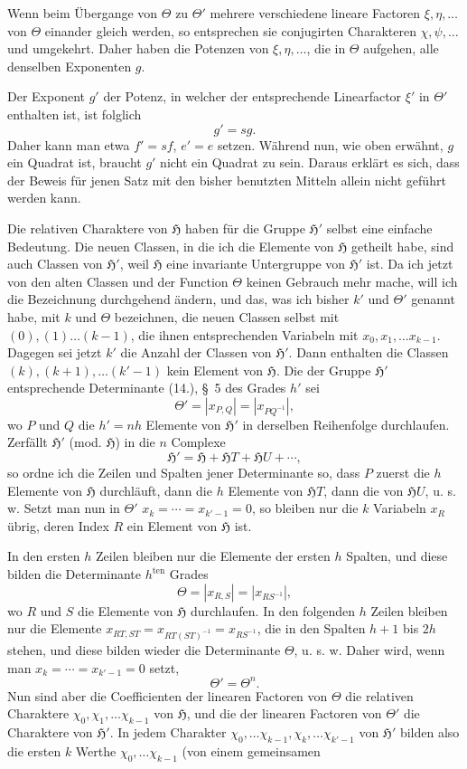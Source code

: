 \documentclass[11pt]{article}
\newcommand{\grp}{\mathfrak{H}}
\begin{document}
Wenn beim Übergange von $\Theta$ zu $\Theta'$ mehrere verschiedene lineare Factoren $\xi,\eta,\ldots$ von $\Theta$ einander gleich werden, so entsprechen sie conjugirten Charakteren $\chi,\psi,\ldots$ und umgekehrt. Daher haben die Potenzen von $\xi,\eta,\ldots$, die in $\Theta$ aufgehen, alle denselben Exponenten $g$.

Der Exponent $g'$ der Potenz, in welcher der entsprechende Linearfactor $\xi'$ in $\Theta'$ enthalten ist, ist folglich
\begin{equation*}\tag{9.}
g'=sg.
\end{equation*}
Daher kann man etwa $f'=sf$, $e'=e$ setzen. Während nun, wie oben erwähnt, $g$ ein Quadrat ist, braucht $g'$ nicht ein Quadrat zu sein. Daraus erklärt es sich, dass der Beweis für jenen Satz mit den bisher benutzten Mitteln allein nicht geführt werden kann.

Die relativen Charaktere von $\grp$ haben für die Gruppe $\grp'$ selbst eine einfache Bedeutung. Die neuen Classen, in die ich die Elemente von $\grp$ getheilt habe, sind auch Classen von $\grp'$, weil $\grp$ eine invariante Untergruppe von $\grp'$ ist. Da ich jetzt von den alten Classen und der Function $\Theta$ keinen Gebrauch mehr mache, will ich die Bezeichnung durchgehend ändern, und das, was ich bisher $k'$ und $\Theta'$ genannt habe, mit $k$ und $\Theta$ bezeichnen, die neuen Classen selbst mit $(0),(1)\ldots(k-1)$, die ihnen entsprechenden Variabeln mit $x_0,x_1,\ldots x_{k-1}$. Dagegen sei jetzt $k'$ die Anzahl der Classen von $\grp'$. Dann enthalten die Classen $(k),(k+1),\ldots(k'-1)$ kein Element von $\grp$. Die der Gruppe $\grp'$ entsprechende Determinante (14.), \S~5 des Grades $h'$ sei
\[
\Theta'=\left|x_{P,Q}\right|=\left|x_{PQ^{-1}}\right|,
\]
wo $P$ und $Q$ die $h'=nh$ Elemente von $\grp'$ in derselben Reihenfolge durchlaufen. Zerfällt $\grp'$ (mod. $\grp$) in die $n$ Complexe
\[
\grp'=\grp+\grp T+\grp U+\cdots,
\]
so ordne ich die Zeilen und Spalten jener Determinante so, dass $P$ zuerst die $h$ Elemente von $\grp$ durchläuft, dann die $h$ Elemente von $\grp T$, dann die von $\grp U$, u. s. w. Setzt man nun in $\Theta'$ $x_k=\cdots=x_{k'-1}=0$, so bleiben nur die $k$ Variabeln $x_R$ übrig, deren Index $R$ ein Element von $\grp$ ist.

In den ersten $h$ Zeilen bleiben nur die Elemente der ersten $h$ Spalten, und diese bilden die Determinante $h^{\text{ten}}$ Grades
\[
\Theta=\left|x_{R,S}\right|=\left|x_{RS^{-1}}\right|,
\]
wo $R$ und $S$ die Elemente von $\grp$ durchlaufen. In den folgenden $h$ Zeilen bleiben nur die Elemente $x_{RT,ST}=x_{RT(ST)^{-1}}=x_{RS^{-1}}$, die in den Spalten $h+1$ bis $2h$ stehen, und diese bilden wieder die Determinante $\Theta$, u. s. w. Daher wird, wenn man $x_k=\cdots=x_{k'-1}=0$ setzt,
\begin{equation*}\tag{10.}
\Theta'=\Theta^n.
\end{equation*}
Nun sind aber die Coefficienten der linearen Factoren von $\Theta$ die relativen Charaktere $\chi_0,\chi_1,\ldots \chi_{k-1}$ von $\grp$, und die der linearen Factoren von $\Theta'$ die Charaktere von $\grp'$. In jedem Charakter $\chi_0,\ldots \chi_{k-1},\chi_k,\ldots \chi_{k'-1}$ von $\grp'$ bilden also die ersten $k$ Werthe $\chi_0,\ldots \chi_{k-1}$ (von einem gemeinsamen
\end{document}
